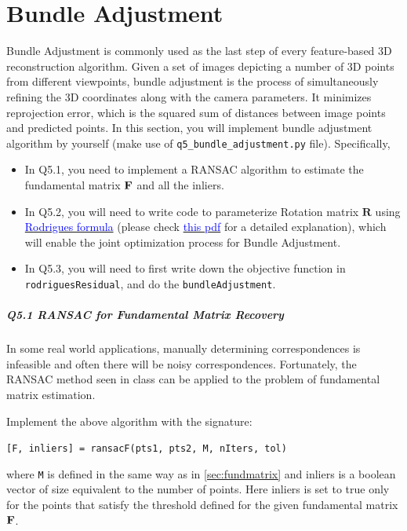 \section{Bundle Adjustment}
\label{sec:bundle}

Bundle Adjustment is commonly used as the last step of every feature-based 3D reconstruction algorithm. Given a set of images depicting a number of 3D points from different viewpoints, bundle adjustment is the process of simultaneously refining the 3D coordinates along with the camera parameters. It minimizes reprojection error, which is the squared sum of distances between image points and predicted points. In this section, you will implement bundle adjustment algorithm by yourself (make use of \texttt{q5\_bundle\_adjustment.py} file). Specifically,

\begin{itemize}
    \item In Q5.1, you need to implement a RANSAC algorithm to estimate the fundamental matrix ${\bf F}$ and all the inliers.
    
    \item In Q5.2, you will need to write code to parameterize Rotation matrix $\mathbf{R}$ using  \href{https://en.wikipedia.org/wiki/Rodrigues\%27\_formula}{\textcolor{blue}{Rodrigues formula}} (please check \href{https://www2.cs.duke.edu/courses/fall13/compsci527/notes/rodrigues.pdf}{\textcolor{blue}{this pdf}} for a detailed explanation), which will enable the joint optimization process for Bundle Adjustment.
    
    \item In Q5.3, you will need to first write down the objective function in \texttt{rodriguesResidual}, and do the \texttt{bundleAdjustment}.
\end{itemize}

\subparagraph*{Q5.1 RANSAC for Fundamental Matrix Recovery}
In some real world applications, manually determining correspondences is infeasible and often there will be noisy correspondences. Fortunately, the RANSAC method seen in class can be applied to the problem of fundamental matrix estimation.

Implement the above algorithm with the signature:
\begin{center}
\texttt{[F, inliers] = ransacF(pts1, pts2, M, nIters, tol)}
\end{center}
where \texttt{M} is defined in the same way as in \autoref{sec:fundmatrix} and inliers is a boolean vector of size equivalent to the number of points. Here inliers is set to true only for the points that satisfy the threshold defined for the given fundamental matrix ${\bf F}$.

